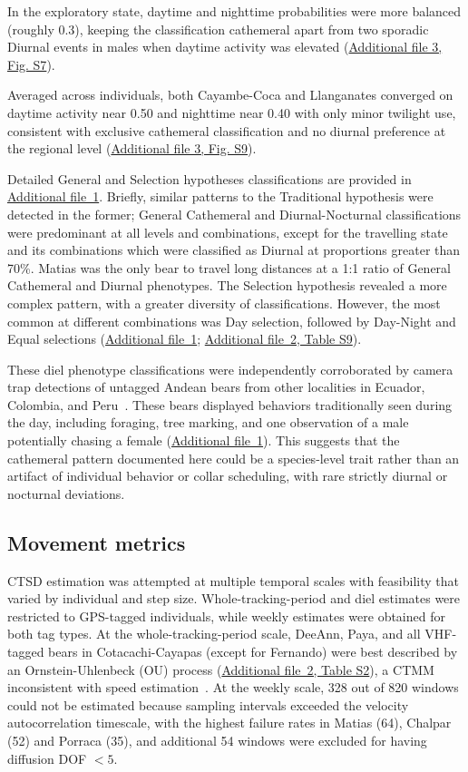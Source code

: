 \documentclass[lineno,referee,pdflatex,sn-vancouver-num]{sn-jnl}%
\theoremstyle{thmstyleone}%
\theoremstyle{thmstyletwo}%
\theoremstyle{thmstylethree}%
\begin{document}
In the exploratory state, daytime and nighttime probabilities were more balanced (roughly 0.3), keeping the classification cathemeral apart from two sporadic Diurnal events in males when daytime
activity was elevated (\hyperref[S3_File]{Additional file 3, Fig. S7}).

Averaged across individuals, both Cayambe-Coca and Llanganates converged on daytime activity
near 0.50 and nighttime near 0.40 with only minor twilight use, consistent with exclusive cathemeral classification and no diurnal preference at the regional level (\hyperref[S3_File]{Additional file 3, Fig. S9}).

Detailed General and Selection hypotheses classifications are provided in \hyperref[S1_File]{Additional file~1}. Briefly, similar patterns to the Traditional hypothesis were detected in the former; General Cathemeral and Diurnal-Nocturnal classifications were predominant at all levels and combinations, except for the travelling state and its combinations which were classified as Diurnal at proportions greater than 70\%. Matias was the only bear to travel long distances at a 1:1 ratio of General Cathemeral and Diurnal phenotypes. The Selection hypothesis revealed a more complex pattern, with a greater diversity of classifications. However, the most common at different combinations was Day selection, followed by Day-Night and Equal selections (\hyperref[S1_File]{Additional file~1}; \hyperref[S1_File]{Additional file~2, Table S9}).

These diel phenotype classifications were independently corroborated by camera trap detections of untagged Andean bears from other localities in Ecuador, Colombia, and Peru~\cite{zotero-item-6551}. These bears displayed behaviors traditionally seen during the day, including foraging, tree marking, and one observation of a male potentially chasing a female (\hyperref[S1_File]{Additional file~1}). This suggests that the cathemeral pattern documented here could be a species-level trait rather than an artifact of individual behavior or collar scheduling, with rare strictly diurnal or nocturnal deviations.

\subsection{Movement metrics}

CTSD estimation was attempted at multiple temporal scales with feasibility that varied by individual and step size. Whole-tracking-period and diel estimates were restricted to GPS-tagged individuals, while weekly estimates were obtained for both tag types.
At the whole-tracking-period scale, DeeAnn, Paya, and all VHF-tagged bears in Cotacachi-Cayapas (except for Fernando) were best described by an Ornstein-Uhlenbeck (OU) process (\hyperref[S2_File]{Additional file~2, Table S2}), a CTMM inconsistent with speed estimation~\cite{noonanScaleinsensitiveEstimationSpeed2019}. At the weekly scale, 328 out of 820 windows could not be estimated because sampling intervals exceeded the velocity autocorrelation timescale, with the highest failure rates in Matias (64), Chalpar (52) and Porraca (35), and additional 54 windows were excluded for having diffusion DOF $< 5$.
\end{document}

